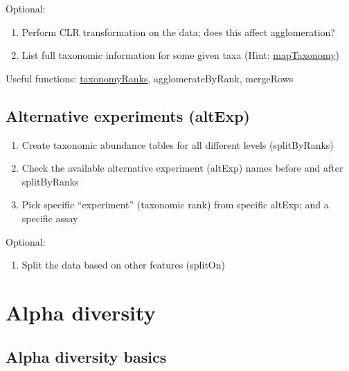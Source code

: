 \documentclass[
]{book}
\providecommand{\tightlist}{%
  \setlength{\itemsep}{0pt}\setlength{\parskip}{0pt}}
\begin{document}
Optional:

\begin{enumerate}
\def\labelenumi{\arabic{enumi}.}
\setcounter{enumi}{3}
\tightlist
\item
  Perform CLR transformation on the data; does this affect agglomeration?
\item
  List full taxonomic information for some given taxa (Hint: \href{https://microbiome.github.io/mia/reference/taxonomy-methods.html}{mapTaxonomy})
\end{enumerate}

Useful functions: \href{https://microbiome.github.io/mia/reference/taxonomy-methods.html}{taxonomyRanks}, agglomerateByRank, mergeRows

\hypertarget{alternative-experiments-altexp}{%
\subsection{Alternative experiments (altExp)}\label{alternative-experiments-altexp}}

\begin{enumerate}
\def\labelenumi{\arabic{enumi}.}
\tightlist
\item
  Create taxonomic abundance tables for all different levels (splitByRanks)
\item
  Check the available alternative experiment (altExp) names before and after splitByRanks
\item
  Pick specific ``experiment'' (taxonomic rank) from specific altExp; and a specific assay
\end{enumerate}

Optional:

\begin{enumerate}
\def\labelenumi{\arabic{enumi}.}
\setcounter{enumi}{3}
\tightlist
\item
  Split the data based on other features (splitOn)
\end{enumerate}

\hypertarget{alpha-diversity}{%
\section{Alpha diversity}\label{alpha-diversity}}

\hypertarget{alpha-diversity-basics}{%
\subsection{Alpha diversity basics}\label{alpha-diversity-basics}}
\end{document}
